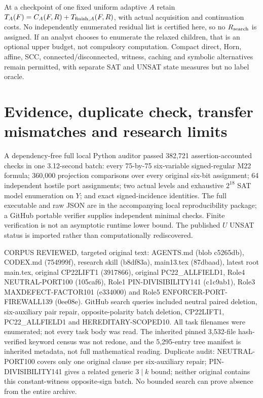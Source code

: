 \documentclass[11pt]{article}
\begin{document}
At a checkpoint of one fixed uniform adaptive $A$ retain $T_A(F)=C_A(F,R)+T_{{\rm finish},A}(F,R)$, with actual acquisition and continuation costs. No independently enumerated residual list is certified here, so no $R_{\rm search}$ is assigned. If an analyst chooses to enumerate the relaxed children, that is an optional upper budget, not compulsory computation. Compact direct, Horn, affine, SCC, connected/disconnected, witness, caching and symbolic alternatives remain permitted, with separate SAT and UNSAT state measures but no label oracle.

\section{Evidence, duplicate check, transfer mismatches and research limits}
A dependency-free full local Python auditor passed 382,721 assertion-accounted checks in one 3.12-second batch: every 75-by-75 six-variable signed-regular M22 formula; 360,000 projection comparisons over every original six-bit assignment; 64 independent hostile port assignments; two actual levels and exhaustive $2^{18}$ SAT model enumeration on $Y$; and exact signed-incidence identities. The full executable and raw JSON are in the accompanying local reproducibility package; a GitHub portable verifier supplies independent minimal checks. Finite verification is not an asymptotic runtime lower bound. The published $U$ UNSAT status is imported rather than computationally rediscovered.

CORPUS REVIEWED, targeted original text: AGENTS.md (blob c5265db), CODEX.md (754999f), research skill (b8df83a), main13.tex (87dbaad), latest root main.tex, original CP22LIFT1 (3917866), original PC22\_ALLFIELD1, Role4 NEUTRAL-PORT100 (105caf6), Role1 PIN-DIVISIBILITY141 (c1c9ab1), Role3 MAXDEFECT-FACTOR101 (e334000) and Role5 ENFORCER-PORT-FIREWALL139 (0ee08e). GitHub search queries included neutral paired deletion, six-auxiliary pair repair, opposite-polarity batch deletion, CP22LIFT1, PC22\_ALLFIELD1 and HEREDITARY-SCOPED10. All task filenames were enumerated; not every task body was read. The inherited pinned 3,532-file hash-verified keyword census was not redone, and the 5,295-entry tree manifest is inherited metadata, not full mathematical reading. Duplicate audit: NEUTRAL-PORT100 covers only one original clause per six-auxiliary repair; PIN-DIVISIBILITY141 gives a related generic $3\mid k$ bound; neither original contains this constant-witness opposite-sign batch. No bounded search can prove absence from the entire archive.
\end{document}
